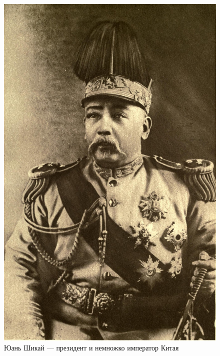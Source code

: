 \begin{figure}[h!tb] 
	\centering\includegraphics[scale=0.3]{Glava4/ypp_fMADLfk.jpg}
	\caption{Юань Шикай — президент и немножко император Китая}%
\end{figure}

